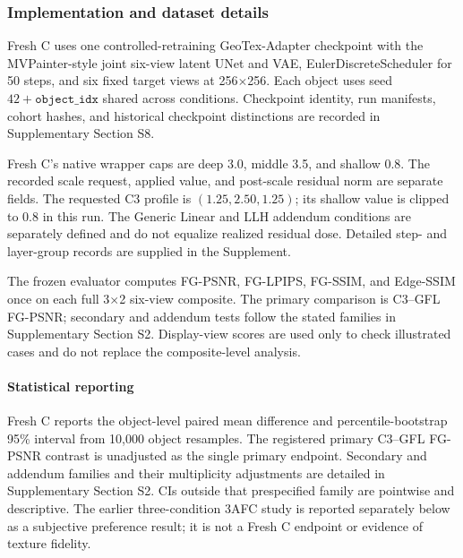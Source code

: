 \documentclass[times,twocolumn,final]{elsarticle}
\providecommand{\DIFadd}[1]{{\protect\color{blue} \sf #1}} %
\providecommand{\DIFaddbegin}{} %
\providecommand{\DIFaddend}{} %
\begin{document}
\subsubsection{Implementation and dataset details}

 
 \DIFaddbegin \DIFadd{Fresh C uses one controlled-retraining GeoTex-Adapter checkpoint with the }\DIFaddend MVPainter-style   \DIFaddbegin \DIFadd{joint }\DIFaddend six-view   \DIFaddbegin \DIFadd{latent UNet and VAE, EulerDiscreteScheduler for }\DIFaddend 50   \DIFaddbegin \DIFadd{steps, and six fixed target views at 256$\times$256. Each object uses seed $42+\texttt{object\_idx}$ shared across conditions. Checkpoint identity, run manifests, cohort hashes, and historical checkpoint distinctions are recorded in Supplementary Section S8}\DIFaddend .

  \DIFaddbegin \DIFadd{Fresh C's native wrapper caps are deep 3.0, middle 3.5, and shallow 0.8. The recorded scale request, applied value, and post-scale residual norm are separate fields. The requested C3 profile is $(1.25,2.50,1.25)$; its shallow value is clipped to 0.8 in this run. The Generic Linear and LLH addendum conditions are separately defined and do not equalize realized residual dose. Detailed step- and layer-group records are supplied in the Supplement.
}

\DIFadd{The frozen evaluator computes FG-PSNR, FG-LPIPS, FG-SSIM, and }\DIFaddend Edge-SSIM   \DIFaddbegin \DIFadd{once on each full 3$\times$2 six-view composite. The primary comparison is C3--GFL FG-PSNR; secondary and addendum tests follow the stated families in Supplementary Section S2. Display-view scores are used only to check illustrated cases and do not replace the composite-level analysis}\DIFaddend .

\paragraph{Statistical reporting}
  \DIFaddbegin \DIFadd{Fresh C reports the object-level paired mean difference and percentile-bootstrap }\DIFaddend 95\%   \DIFaddbegin \DIFadd{interval from }\DIFaddend 10{,}000   \DIFaddbegin \DIFadd{object resamples. The registered primary C3--GFL FG-PSNR contrast is unadjusted as the single primary endpoint. Secondary and addendum families and their multiplicity adjustments are detailed in Supplementary Section S2. CIs outside that prespecified family are pointwise and descriptive. The earlier three-condition 3AFC study is reported separately below as a subjective preference result; it is not a Fresh C endpoint or evidence of texture fidelity}\DIFaddend .
\end{document}
